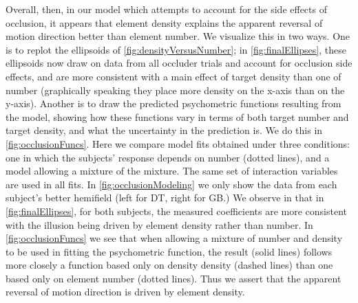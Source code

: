 \documentclass[../manuscript]{subfiles}
\def\biblio{}
\begin{document}
\begin{figure}
\begin{subfigure}[b]{.60\linewidth}
		\label{fig:occlusionFuncs}
	\end{subfigure}
	\caption{}\label{fig:occlusionModeling}
\end{figure}

Overall, then, in our model which attempts to account for the side effects of occlusion, it appears that element density explains the apparent reversal of motion direction better than element number. We visualize this in two ways. One is to replot the ellipsoids of \autoref{fig:densityVersusNumber}; in \autoref{fig:finalEllipses}, these ellipsoids now draw on data from all occluder trials and account for occlusion side effects, and are more consistent with a main effect of target density than one of number (graphically speaking they place more density on the x-axis than on the y-axis). Another is to draw the predicted psychometric functions resulting from the model, showing how these functions vary in terms of both target number and target density, and what the uncertainty in the prediction is. We do this in \autoref{fig:occlusionFuncs}. Here we compare model fits obtained under three conditions: one in which the subjects' response depends on number (dotted lines), and a model allowing a mixture of the mixture. The same set of interaction variables are used in all fits. In \autoref{fig:occlusionModeling} we only show the data from each subject's better hemifield (left for DT, right for GB.) We observe in that in \autoref{fig:finalEllipses}, for both subjects, the measured coefficients are more consistent with the illusion being driven by element density rather than number. In \autoref{fig:occlusionFuncs} we see that when allowing a mixture of number and density to be used in fitting the psychometric function, the result (solid lines) follows more closely a function based only on density density (dashed lines) than one based only on element number (dotted lines). Thus we assert that the apparent reversal of motion direction is driven by element density.

\biblio
\end{document}
